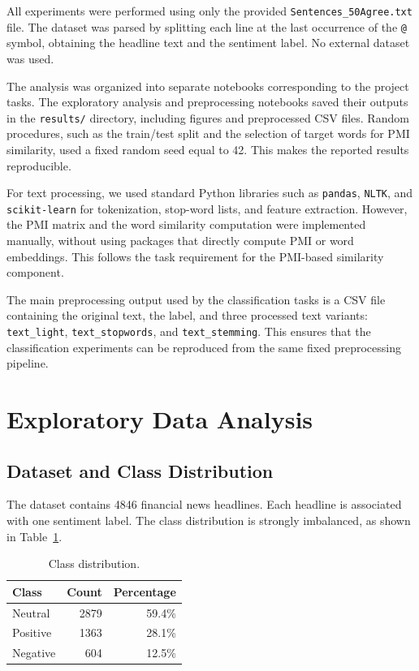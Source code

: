 \documentclass[sigconf,nonacm]{acmart}
\begin{document}
All experiments were performed using only the provided \texttt{Sentences\_50Agree.txt} file. The dataset was parsed by splitting each line at the last occurrence of the \texttt{@} symbol, obtaining the headline text and the sentiment label. No external dataset was used.

The analysis was organized into separate notebooks corresponding to the project tasks. The exploratory analysis and preprocessing notebooks saved their outputs in the \texttt{results/} directory, including figures and preprocessed CSV files. Random procedures, such as the train/test split and the selection of target words for PMI similarity, used a fixed random seed equal to 42. This makes the reported results reproducible.

For text processing, we used standard Python libraries such as \texttt{pandas}, \texttt{NLTK}, and \texttt{scikit-learn} for tokenization, stop-word lists, and feature extraction. However, the PMI matrix and the word similarity computation were implemented manually, without using packages that directly compute PMI or word embeddings. This follows the task requirement for the PMI-based similarity component.

The main preprocessing output used by the classification tasks is a CSV file containing the original text, the label, and three processed text variants: \texttt{text\_light}, \texttt{text\_stopwords}, and \texttt{text\_stemming}. This ensures that the classification experiments can be reproduced from the same fixed preprocessing pipeline.

\section{Exploratory Data Analysis}
\label{sec:eda}

\subsection{Dataset and Class Distribution}

The dataset contains 4846 financial news headlines. Each headline is associated with one sentiment label. The class distribution is strongly imbalanced, as shown in Table~\ref{tab:class-dist}.

\begin{table}[t]
\centering
\caption{Class distribution.}
\label{tab:class-dist}
\begin{tabular}{lrr}
\toprule
Class & Count & Percentage \\
\midrule
Neutral  & 2879 & 59.4\% \\
Positive & 1363 & 28.1\% \\
Negative & 604  & 12.5\% \\
\bottomrule
\end{tabular}
\end{table}
\end{document}
